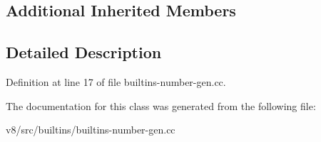 \subsection*{Additional Inherited Members}


\subsection{Detailed Description}


Definition at line 17 of file builtins-\/number-\/gen.\+cc.



The documentation for this class was generated from the following file\+:\begin{DoxyCompactItemize}
\item 
v8/src/builtins/builtins-\/number-\/gen.\+cc\end{DoxyCompactItemize}
